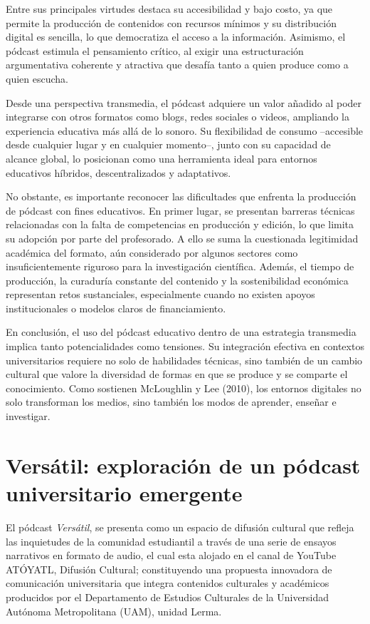 \documentclass[
]{interact}
\begin{document}
Entre sus principales virtudes destaca su accesibilidad y bajo costo, ya
que permite la producción de contenidos con recursos mínimos y su
distribución digital es sencilla, lo que democratiza el acceso a la
información. Asimismo, el pódcast estimula el pensamiento crítico, al
exigir una estructuración argumentativa coherente y atractiva que
desafía tanto a quien produce como a quien escucha.

Desde una perspectiva transmedia, el pódcast adquiere un valor añadido
al poder integrarse con otros formatos como blogs, redes sociales o
videos, ampliando la experiencia educativa más allá de lo sonoro. Su
flexibilidad de consumo --accesible desde cualquier lugar y en cualquier
momento--, junto con su capacidad de alcance global, lo posicionan como
una herramienta ideal para entornos educativos híbridos,
descentralizados y adaptativos.

No obstante, es importante reconocer las dificultades que enfrenta la
producción de pódcast con fines educativos. En primer lugar, se
presentan barreras técnicas relacionadas con la falta de competencias en
producción y edición, lo que limita su adopción por parte del
profesorado. A ello se suma la cuestionada legitimidad académica del
formato, aún considerado por algunos sectores como insuficientemente
riguroso para la investigación científica. Además, el tiempo de
producción, la curaduría constante del contenido y la sostenibilidad
económica representan retos sustanciales, especialmente cuando no
existen apoyos institucionales o modelos claros de financiamiento.

En conclusión, el uso del pódcast educativo dentro de una estrategia
transmedia implica tanto potencialidades como tensiones. Su integración
efectiva en contextos universitarios requiere no solo de habilidades
técnicas, sino también de un cambio cultural que valore la diversidad de
formas en que se produce y se comparte el conocimiento. Como sostienen
McLoughlin y Lee (2010), los entornos digitales no solo transforman los
medios, sino también los modos de aprender, enseñar e investigar.

\section{Versátil: exploración de un pódcast universitario
emergente}\label{versuxe1til-exploraciuxf3n-de-un-puxf3dcast-universitario-emergente}

El pódcast \emph{Versátil}, se presenta como un espacio de difusión
cultural que refleja las inquietudes de la comunidad estudiantil a
través de una serie de ensayos narrativos en formato de audio, el cual
esta alojado en el canal de YouTube ATÓYATL, Difusión Cultural;
constituyendo una propuesta innovadora de comunicación universitaria que
integra contenidos culturales y académicos producidos por el
Departamento de Estudios Culturales de la Universidad Autónoma
Metropolitana (UAM), unidad Lerma.
\end{document}
